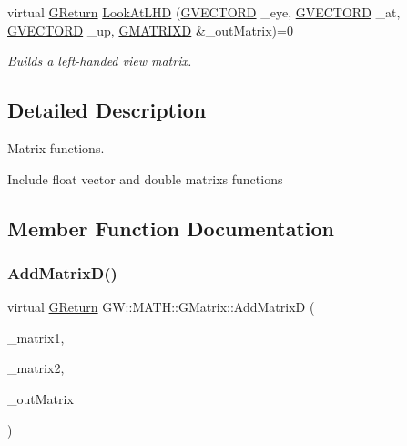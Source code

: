 \begin{DoxyCompactItemize}
virtual \hyperlink{namespaceGW_a67a839e3df7ea8a5c5686613a7a3de21}{G\+Return} \hyperlink{classGW_1_1MATH_1_1GMatrix_afa59696f30ec1fdaeb503df9b62e4ae2}{Look\+At\+L\+HD} (\hyperlink{structGW_1_1MATH_1_1GVECTORD}{G\+V\+E\+C\+T\+O\+RD} \+\_\+eye, \hyperlink{structGW_1_1MATH_1_1GVECTORD}{G\+V\+E\+C\+T\+O\+RD} \+\_\+at, \hyperlink{structGW_1_1MATH_1_1GVECTORD}{G\+V\+E\+C\+T\+O\+RD} \+\_\+up, \hyperlink{structGW_1_1MATH_1_1GMATRIXD}{G\+M\+A\+T\+R\+I\+XD} \&\+\_\+out\+Matrix)=0
\begin{DoxyCompactList}\small\item\em Builds a left-\/handed view matrix. \end{DoxyCompactList}\end{DoxyCompactItemize}


\subsection{Detailed Description}
Matrix functions. 

Include float vector and double matrix\textquotesingle{}s functions 

\subsection{Member Function Documentation}
\mbox{\label{classGW_1_1MATH_1_1GMatrix_a9ae855c7cfbfa08c84bd76a556302bc5}} 
\subsubsection{\texorpdfstring{Add\+Matrix\+D()}{AddMatrixD()}}
{\footnotesize\ttfamily virtual \hyperlink{namespaceGW_a67a839e3df7ea8a5c5686613a7a3de21}{G\+Return} G\+W\+::\+M\+A\+T\+H\+::\+G\+Matrix\+::\+Add\+MatrixD (\begin{DoxyParamCaption}\item[{\hyperlink{structGW_1_1MATH_1_1GMATRIXD}{G\+M\+A\+T\+R\+I\+XD}}]{\+\_\+matrix1,  }\item[{\hyperlink{structGW_1_1MATH_1_1GMATRIXD}{G\+M\+A\+T\+R\+I\+XD}}]{\+\_\+matrix2,  }\item[{\hyperlink{structGW_1_1MATH_1_1GMATRIXD}{G\+M\+A\+T\+R\+I\+XD} \&}]{\+\_\+out\+Matrix }\end{DoxyParamCaption})\hspace{0.3cm}{\ttfamily [pure virtual]}}



